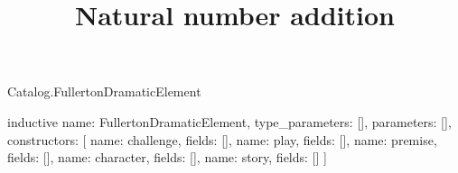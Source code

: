 \begin{lexlean}{Catalog.FullertonDramaticElement}
\title{Natural number addition}
\begin{semanticmodule}
inductive{
  name: FullertonDramaticElement,
  type_parameters: [],
  parameters: [],
  constructors: [
    {name: challenge, fields: []},
    {name: play, fields: []},
    {name: premise, fields: []},
    {name: character, fields: []},
    {name: story, fields: []}
  ]
}
\end{semanticmodule}
\end{lexlean}
